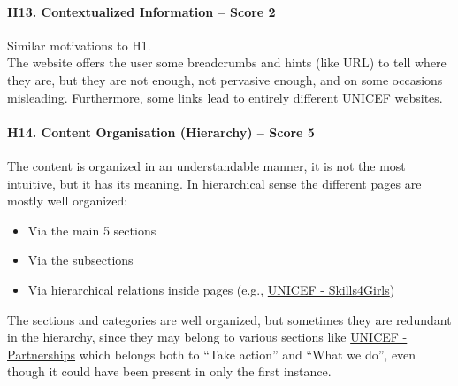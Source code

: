 \paragraph*{H13. Contextualized Information – Score 2}
Similar motivations to H1.\\
The website offers the user some breadcrumbs and hints (like URL) to tell where they are, but they are not enough, not pervasive enough, and on some occasions misleading. Furthermore, some links lead to entirely different UNICEF websites.

\paragraph*{H14. Content Organisation (Hierarchy) – Score 5}
The content is organized in an understandable manner, it is not the most intuitive, but it has its meaning. In hierarchical sense the different pages are mostly well organized:
\begin{itemize}
	\item Via the main 5 sections
	\item Via the subsections
	\item Via hierarchical relations inside pages (e.g., \href{https://www.unicef.org/gender-equality/skills4girls}{UNICEF - Skills4Girls})
\end{itemize}
The sections and categories are well organized, but sometimes they are redundant in the hierarchy, since they may belong to various sections like \href{https://www.unicef.org/partnerships}{UNICEF - Partnerships} which belongs both to “Take action” and “What we do”, even though it could have been present in only the first instance.

